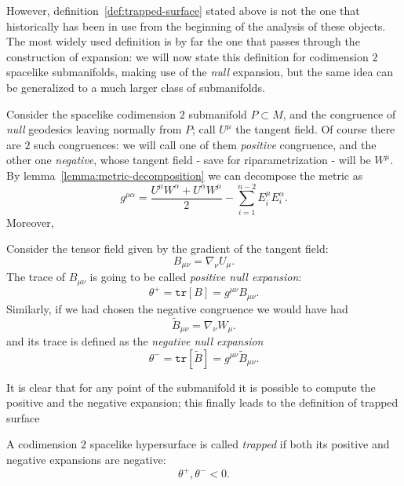 However, definition~\ref{def:trapped-surface} stated above is not the one that historically has been in use from the beginning of the analysis of these objects. The most widely used definition is by far the one that passes through the construction of expansion: we will now state this definition for codimension \(2\) spacelike submanifolds, making use of the \emph{null} expansion, but the same idea can be generalized to a much larger class of submanifolds. 

Consider the spacelike codimension \(2\) submanifold \(P\subset M\), and the congruence of \emph{null} geodesics leaving normally from \(P\); call \(U^{\mu}\) the tangent field. 
Of course there are \(2\) such congruences: we will call one of them \emph{positive} congruence, and the other one \emph{negative}, whose tangent field - save for riparametrization - will be \(W^{\mu}\). By lemma~\ref{lemma:metric-decomposition} we can decompose the metric as 
\[
g^{\mu\alpha} = \frac{U^{\mu}W^{\alpha} + U^{\alpha}W^{\mu}}{2} - \sum_{i=1}^{n - 2}E_i^{\mu}E_i^{\alpha}.
\]
Moreover,
\begin{definition}
	 Consider the tensor field given by the gradient of the tangent field:
	\[
	B_{\mu\nu} = \nabla_{\nu}U_{\mu}.
	\]
	The trace of \(B_{\mu\nu}\) is going to be called \emph{positive null expansion}:
	\[
	\theta^{+} = \texttt{tr}\left[B\right] = g^{\mu\nu}B_{\mu\nu}.
	\]
	Similarly, if we had chosen the negative congruence we would have had
	\[
	\tilde{B}_{\mu\nu} = \nabla_{\nu}W_{\mu}.
	\]
	and its trace is defined as the \emph{negative null expansion}
	\[
	\theta^{-} = \texttt{tr}\left[\tilde{B}\right] = g^{\mu\nu}\tilde{B}_{\mu\nu}.
	\]
\end{definition}
It is clear that for any point of the submanifold it is possible to compute the positive and the negative expansion; this finally leads to the definition of trapped surface
\begin{definition}
	A codimension \(2\) spacelike hypersurface is called \emph{trapped} if both its positive and negative expansions are negative:
	\[
	\theta^+ , \theta^- < 0.
	\]
\end{definition}


